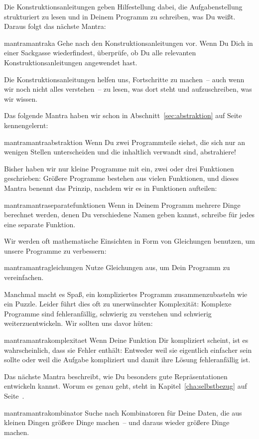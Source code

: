 Die Konstruktionsanleitungen geben Hilfestellung dabei,
die Aufgabenstellung strukturiert zu lesen und in Deinem Programm
zu schreiben, was Du weißt.  Daraus folgt das nächste Mantra:
%
\begin{restatable}{mantra}{mantraka}
  \label{mantra:ka}
  Gehe nach den Konstruktionsanleitungen vor.  Wenn Du Dich in einer
  Sackgasse wiederfindest, überprüfe, ob Du alle relevanten
  Konstruktionsanleitungen angewendet hast.
\end{restatable}
%
\noindent Die Konstruktionsanleitungen helfen uns, Fortschritte zu machen~-- auch
wenn wir noch nicht alles verstehen~-- zu lesen, was dort steht und
aufzuschreiben, was wir wissen.

Das folgende Mantra haben wir schon in Abschnitt~\ref{sec:abstraktion}
auf Seite~\pageref{sec:abstraktion} kennengelernt:
%
\begin{restatable}{mantra}{mantraabstraktion}
  \label{mantra:abstraktion}
  Wenn Du zwei Programmteile siehst, die sich nur an wenigen Stellen
  unterscheiden und die inhaltlich verwandt sind, abstrahiere!
\end{restatable}
%
\noindent Bisher haben wir nur kleine Programme mit ein, zwei oder drei
Funktionen geschrieben: Größere Programme bestehen aus vielen
Funktionen, und dieses Mantra benennt das Prinzip, nachdem wir es in
Funktionen aufteilen:
%
\begin{restatable}{mantra}{mantraseparatefunktionen}
  \label{mantra:separate-funktionen}
  Wenn in Deinem Programm mehrere Dinge berechnet werden, denen Du
  verschiedene Namen geben kannst, schreibe für jedes eine separate
  Funktion.
\end{restatable}
%
\noindent Wir werden oft mathematische Einsichten in Form von Gleichungen
benutzen, um unsere Programme zu verbessern:
%
\begin{restatable}{mantra}{mantragleichungen}
  \label{mantra:gleichungen}
  Nutze Gleichungen aus, um Dein Programm zu vereinfachen.
\end{restatable}
%
\noindent Manchmal macht es Spaß, ein kompliziertes Programm zusammenzubasteln
wie ein Puzzle.  Leider führt dies oft zu unerwünschter Komplexität:
Komplexe Programme sind fehleranfällig, schwierig zu verstehen und
schwierig weiterzuentwickeln.  Wir sollten uns davor hüten:
%
\begin{restatable}{mantra}{mantrakomplexitaet}
  \label{mantra:komplexitaet}
  Wenn Deine Funktion Dir kompliziert scheint, ist es wahrscheinlich,
  dass sie Fehler enthält: Entweder weil sie eigentlich einfacher
  sein sollte oder weil die Aufgabe kompliziert und damit ihre Lösung
  fehleranfällig ist.
\end{restatable}
%
\noindent Das nächste Mantra beschreibt, wie Du besonders gute Repräsentationen
entwickeln kannst.  Worum es genau geht, steht in
Kapitel~\ref{cha:selbstbezug} auf Seite~\pageref{cha:selbstbezug}.
%
\begin{restatable}{mantra}{mantrakombinator}
  \label{mantra:kombinator}
  Suche nach Kombinatoren für Deine Daten, die aus
  kleinen Dingen größere Dinge machen~-- und daraus wieder größere
  Dinge machen.
\end{restatable}


